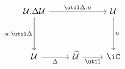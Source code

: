 \[\begin{tikzcd}
	{\Ty.\Delta\Ty} && \Ty \\
	\\
	\Ty & \Tm & \iC
	\arrow["u", from=1-3, to=3-3]
	\arrow["\Delta"', from=3-1, to=3-2]
	\arrow["\util"', from=3-2, to=3-3]
	\arrow["{u.\util\Delta}"', from=1-1, to=3-1]
	\arrow["{\util\Delta.u}", from=1-1, to=1-3]
\end{tikzcd}\]